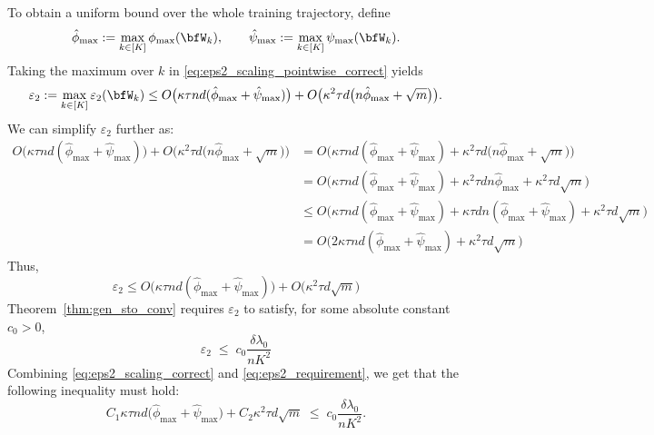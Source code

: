 \documentclass[10pt]{article} %
\theoremstyle{definition}
\theoremstyle{plain}
\begin{document}
To obtain a uniform bound over the whole training trajectory, define
\[
\hat\phi_{\max} := \max_{k\in[K]}\phi_{\max}(\bfW_k),
\qquad
\hat\psi_{\max} := \max_{k\in[K]}\psi_{\max}(\bfW_k).
\]
Taking the maximum over $k$ in \eqref{eq:eps2_scaling_pointwise_correct} yields
\begin{equation*}
\label{eq:eps2_scaling_correct}
\varepsilon_2
:= \max_{k\in[K]}\varepsilon_2(\bfW_k)
 \le 
O\big(\kappa\tau n d(\hat\phi_{\max}+\hat\psi_{\max})\big)
+ O\big(\kappa^2\tau d\big(n\hat\phi_{\max}+\sqrt{m}\big)\big).
\end{equation*}
We can simplify $\varepsilon_2$ further as:
\begin{align*}
    O\big(\kappa\tau n d(\hat\phi_{\max}+\hat\psi_{\max})\big)
+ O\big(\kappa^2\tau d\big(n\hat\phi_{\max}+\sqrt{m}\big)\big) &= O\big(\kappa\tau n d(\hat\phi_{\max}+\hat\psi_{\max})+\kappa^2\tau d\big(n\hat\phi_{\max}+\sqrt{m}\big)\big) \\
&= O\big(\kappa\tau n d(\hat\phi_{\max}+\hat\psi_{\max})+\kappa^2\tau dn\hat\phi_{\max}+\kappa^2\tau d\sqrt{m}\big) \\
&\leq O\big(\kappa\tau n d(\hat\phi_{\max}+\hat\psi_{\max})+\kappa\tau dn(\hat\phi_{\max}+\hat\psi_{\max})+\kappa^2\tau d\sqrt{m}\big) 
\\
&= O\big(2\kappa\tau n d(\hat\phi_{\max}+\hat\psi_{\max})+\kappa^2\tau d\sqrt{m}\big) 
\end{align*}
Thus, 
\begin{equation}
\label{eq:eps2_scaling_correct}
\boxed{\varepsilon_2 \leq
O\big(\kappa\tau n d(\hat\phi_{\max}+\hat\psi_{\max})\big)+ O\big(\kappa^2\tau d\sqrt{m}\big)}
\end{equation}
Theorem~\ref{thm:gen_sto_conv} requires
$\varepsilon_2$ to satisfy, for some absolute constant $c_0>0$,
\begin{equation}
\label{eq:eps2_requirement}
    \varepsilon_2
    \;\le\;
    c_0 \frac{\delta\lambda_0}{nK^2}
\end{equation}
Combining \eqref{eq:eps2_scaling_correct} and
\eqref{eq:eps2_requirement}, we get that the following inequality must hold: 
\begin{equation}
\label{eq:eps2_ineq_raw}
    C_1 \kappa\tau n d\bigl(\hat\phi_{\max}+\hat\psi_{\max}\bigr)
    +
    C_2 \kappa^2\tau d\sqrt{m}
    \;\le\;
    c_0 \frac{\delta\lambda_0}{nK^2}.
\end{equation}
\end{document}
